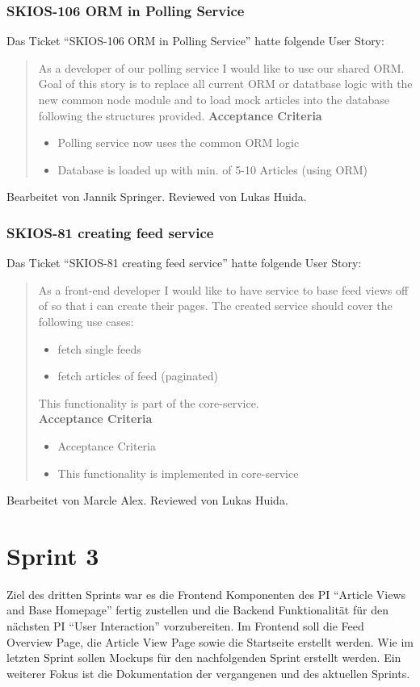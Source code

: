 \subsubsection{SKIOS-106 ORM in Polling Service}
Das Ticket \enquote{SKIOS-106 ORM in Polling Service} hatte folgende User Story:
\begin{quotation}
    As a developer of our polling service I would like to use our shared ORM.
    Goal of this story is to replace all current ORM or datatbase logic with the new common node module and to load mock articles into the database following the structures provided.
\textbf{Acceptance Criteria}
\begin{itemize}
    \item Polling service now uses the common ORM logic
    \item Database is loaded up with min. of 5-10 Articles (using ORM)
\end{itemize}
\end{quotation}
Bearbeitet von Jannik Springer.
Reviewed von Lukas Huida.

\subsubsection{SKIOS-81 creating feed service}
Das Ticket \enquote{SKIOS-81 creating feed service} hatte folgende User Story:
\begin{quotation}
As a front-end developer I would like to have service to base feed views off of so that i can create their pages.
The created service should cover the following use cases:
\begin{itemize}
    \item fetch single feeds
    \item fetch articles of feed (paginated)
\end{itemize}
This functionality is part of the core-service.\\
\textbf{Acceptance Criteria}
\begin{itemize}
    \item Acceptance Criteria
    \item This functionality is implemented in core-service
\end{itemize}
\end{quotation}
Bearbeitet von Marcle Alex.
Reviewed von Lukas Huida.

\section{Sprint 3}
Ziel des dritten Sprints war es die Frontend Komponenten des \ac{PI} \enquote{Article Views and Base Homepage} fertig zustellen und die Backend Funktionalität für den nächsten \ac{PI} \enquote{User Interaction} vorzubereiten.
Im Frontend soll die Feed Overview Page, die Article View Page sowie die Startseite erstellt werden.
Wie im letzten Sprint sollen Mockups für den nachfolgenden Sprint erstellt werden.
Ein weiterer Fokus ist die Dokumentation der vergangenen und des aktuellen Sprints.

